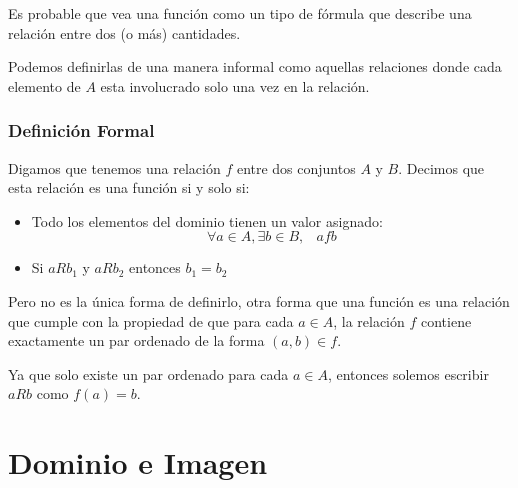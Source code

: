 \documentclass[12pt, fleqn]{report}                             %
\DeclareMathOperator \Space {\quad}                             %
\DeclareMathOperator \MiniSpace {\;}                            %
\begin{document}
            Es probable que vea una función como un tipo de fórmula que describe una relación entre dos
            (o más) cantidades.

            Podemos definirlas de una manera informal como aquellas relaciones donde cada elemento de $A$ 
            esta involucrado solo una vez en la relación.

            \subsubsection*{Definición Formal}

            Digamos que tenemos una relación $f$ entre dos conjuntos $A$ y $B$.
            Decimos que esta relación es una función si y solo si:

            \begin{itemize}
                \item Todo los elementos del dominio tienen un valor asignado:
                    \begin{equation}
                        \forall a \in A, \exists b \in B, \MiniSpace afb
                    \end{equation}

                \item Si $aRb_1$ y $aRb_2$ entonces $b_1 = b_2$

            \end{itemize}

            Pero no es la única forma de definirlo, otra forma que una función es una relación que 
            cumple con la propiedad de que para cada $a \in A$, la relación $f$ contiene exactamente
            un par ordenado de la forma $(a,b) \in f$.

            Ya que solo existe un par ordenado para cada $a \in A$, entonces solemos escribir 
            $aRb$ como $f(a) = b$.







        \clearpage
        \section{Dominio e Imagen}
            
\end{document}
